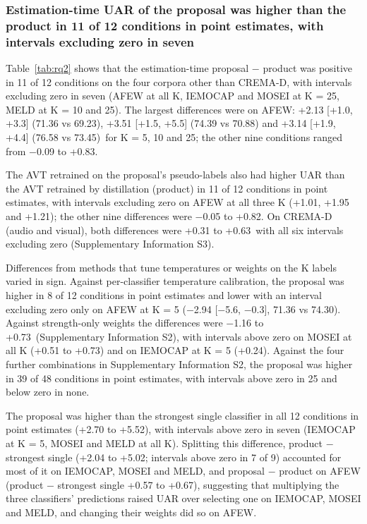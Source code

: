 \subsubsection{Estimation-time UAR of the proposal was higher than the product in 11 of 12 conditions in point estimates, with intervals excluding zero in seven}
Table~\ref{tab:rq2} shows that the estimation-time proposal $-$ product was positive in 11 of 12 conditions on the four corpora other than CREMA-D, with intervals excluding zero in seven (AFEW at all K, IEMOCAP and MOSEI at K = 25, MELD at K = 10 and 25). The largest differences were on AFEW: +2.13 [+1.0, +3.3] (71.36 vs 69.23), +3.51 [+1.5, +5.5] (74.39 vs 70.88) and +3.14 [+1.9, +4.4] (76.58 vs 73.45)\pt\ for K = 5, 10 and 25; the other nine conditions ranged from $-$0.09 to +0.83\pt.

The AVT retrained on the proposal's pseudo-labels also had higher UAR than the AVT retrained by distillation (product) in 11 of 12 conditions in point estimates, with intervals excluding zero on AFEW at all three K (+1.01, +1.95 and +1.21\pt); the other nine differences were $-$0.05 to +0.82\pt. On CREMA-D (audio and visual), both differences were +0.31 to +0.63\pt\ with all six intervals excluding zero (Supplementary Information S3).

Differences from methods that tune temperatures or weights on the K labels varied in sign. Against per-classifier temperature calibration, the proposal was higher in 8 of 12 conditions in point estimates and lower with an interval excluding zero only on AFEW at K = 5 ($-$2.94 [$-$5.6, $-$0.3], 71.36 vs 74.30). Against strength-only weights the differences were $-$1.16 to +0.73\pt\ (Supplementary Information S2), with intervals above zero on MOSEI at all K (+0.51 to +0.73\pt) and on IEMOCAP at K = 5 (+0.24\pt). Against the four further combinations in Supplementary Information S2, the proposal was higher in 39 of 48 conditions in point estimates, with intervals above zero in 25 and below zero in none.

The proposal was higher than the strongest single classifier in all 12 conditions in point estimates (+2.70 to +5.52\pt), with intervals above zero in seven (IEMOCAP at K = 5, MOSEI and MELD at all K). Splitting this difference, product $-$ strongest single (+2.04 to +5.02\pt; intervals above zero in 7 of 9) accounted for most of it on IEMOCAP, MOSEI and MELD, and proposal $-$ product on AFEW (product $-$ strongest single +0.57 to +0.67\pt), suggesting that multiplying the three classifiers' predictions raised UAR over selecting one on IEMOCAP, MOSEI and MELD, and changing their weights did so on AFEW.

